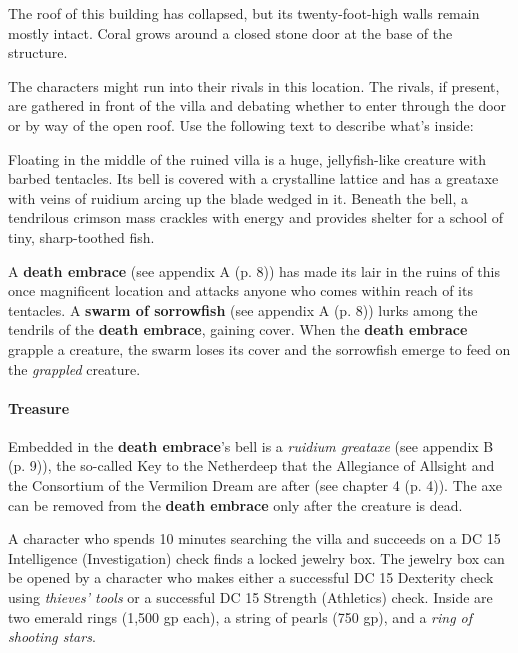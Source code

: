 \documentclass[a4paper, 11pt, bg=full, twocolumn, nooutline]{dndbook}
\begin{document}
\begin{DndReadAloud}
The roof of this building has collapsed, but its twenty-foot-high walls remain mostly intact. Coral grows around a closed stone door at the base of the structure.
\end{DndReadAloud}

The characters might run into their rivals in this location. The rivals, if present, are gathered in front of the villa and debating whether to enter through the door or by way of the open roof. Use the following text to describe what's inside:

\begin{DndReadAloud}
Floating in the middle of the ruined villa is a huge, jellyfish-like creature with barbed tentacles. Its bell is covered with a crystalline lattice and has a greataxe with veins of ruidium arcing up the blade wedged in it. Beneath the bell, a tendrilous crimson mass crackles with energy and provides shelter for a school of tiny, sharp-toothed fish.
\end{DndReadAloud}

A \textbf{death embrace} (see appendix A (p. 8)) has made its lair in the ruins of this once magnificent location and attacks anyone who comes within reach of its tentacles. A \textbf{swarm of sorrowfish} (see appendix A (p. 8)) lurks among the tendrils of the \textbf{death embrace}, gaining cover. When the \textbf{death embrace} grapple a creature, the swarm loses its cover and the sorrowfish emerge to feed on the \textit{grappled} creature.

\paragraph{Treasure}

Embedded in the \textbf{death embrace}'s bell is a \textit{ruidium greataxe} (see appendix B (p. 9)), the so-called Key to the Netherdeep that the Allegiance of Allsight and the Consortium of the Vermilion Dream are after (see chapter 4 (p. 4)). The axe can be removed from the \textbf{death embrace} only after the creature is dead.

A character who spends 10 minutes searching the villa and succeeds on a DC 15 Intelligence (Investigation) check finds a locked jewelry box. The jewelry box can be opened by a character who makes either a successful DC 15 Dexterity check using \textit{thieves' tools} or a successful DC 15 Strength (Athletics) check. Inside are two emerald rings (1,500 gp each), a string of pearls (750 gp), and a \textit{ring of shooting stars}.
\end{document}
